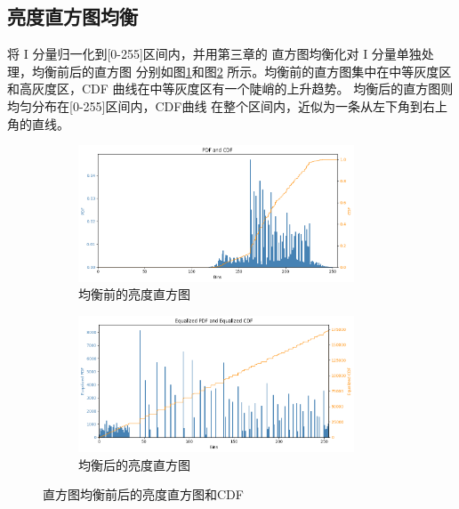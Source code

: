 \documentclass[UTF8]{article}
\begin{document}
\subsection{亮度直方图均衡}
将 I 分量归一化到[0-255]区间内，并用第三章的
直方图均衡化对 I 分量单独处理，均衡前后的直方图
分别如图\ref{fig:均衡前的直方图}和图\ref{fig:均衡后的直方图}
所示。均衡前的直方图集中在中等灰度区和高灰度区，CDF
曲线在中等灰度区有一个陡峭的上升趋势。
均衡后的直方图则均匀分布在[0-255]区间内，CDF曲线
在整个区间内，近似为一条从左下角到右上角的直线。
\begin{figure}[htbp]
    \centering
    \begin{subfigure}{0.45\textwidth}
      \centering
      \includegraphics[width=0.9\textwidth]{img/均衡前的直方图.png}
      \caption{均衡前的亮度直方图}
      \label{fig:均衡前的直方图} %
    \end{subfigure}
    \begin{subfigure}{0.45\textwidth}
      \centering
      \includegraphics[width=0.9\textwidth]{img/均衡后的直方图.png}
      \caption{均衡后的亮度直方图}
      \label{fig:均衡后的直方图} %
    \end{subfigure}
    \caption{直方图均衡前后的亮度直方图和CDF}
    \label{fig:均衡} %
\end{figure}
\end{document}
